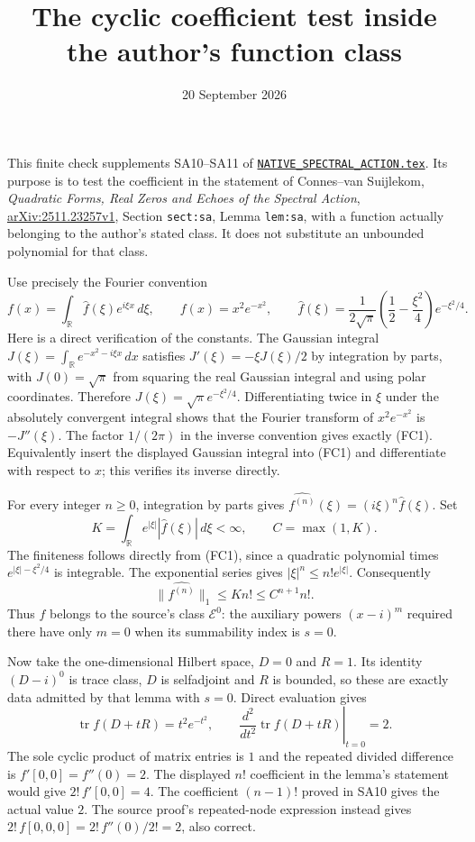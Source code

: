 \documentclass[11pt]{article}
\title{The cyclic coefficient test inside the author's function class}
\author{}\date{20 September 2026}
\begin{document}
\maketitle

This finite check supplements SA10--SA11 of
\href{https://github.com/KokunoYumeto/zeta-function-research-reader/blob/5992ad50c0f2a06921f1fcaded7b4e38097c0739/workbenches/splitzero-tandem/continuations/20260920-original-kernel-mixed-determinants/providers/NATIVE_SPECTRAL_ACTION.tex\#L1}{\texttt{NATIVE\_SPECTRAL\_ACTION.tex}}. Its purpose is to test
the coefficient in the statement of Connes--van Suijlekom,
\emph{Quadratic Forms, Real Zeros and Echoes of the Spectral Action},
\href{https://arxiv.org/abs/2511.23257v1}{arXiv:2511.23257v1},
Section \texttt{sect:sa}, Lemma \texttt{lem:sa}, with a
function actually belonging to the author's stated class.
It does not substitute an unbounded polynomial for that class.

Use precisely the Fourier convention
\[
f(x)=\int_{\mathbb R}\widehat f(\xi)e^{i\xi x}\,d\xi,
\qquad
f(x)=x^2e^{-x^2},\qquad
\widehat f(\xi)=\frac1{2\sqrt\pi}
\left(\frac12-\frac{\xi^2}{4}\right)e^{-\xi^2/4}.
\tag{FC1}
\]
Here is a direct verification of the constants.
The Gaussian integral
$J(\xi)=\int_{\mathbb R}e^{-x^2-i\xi x}\,dx$ satisfies
$J'(\xi)=-\xi J(\xi)/2$ by integration by parts, with
$J(0)=\sqrt\pi$ from squaring the real Gaussian integral
and using polar coordinates. Therefore
$J(\xi)=\sqrt\pi e^{-\xi^2/4}$.
Differentiating twice in $\xi$ under the absolutely
convergent integral shows that the Fourier transform
of $x^2e^{-x^2}$ is $-J''(\xi)$.
The factor $1/(2\pi)$ in the inverse convention gives
exactly (FC1). Equivalently insert the displayed
Gaussian integral into (FC1) and differentiate with
respect to $x$; this verifies its inverse directly.

For every integer $n\geq0$, integration by parts gives
$\widehat{f^{(n)}}(\xi)=(i\xi)^n\widehat f(\xi)$.
Set
\[
K=\int_{\mathbb R}e^{|\xi|}|\widehat f(\xi)|\,d\xi<\infty,
\qquad C=\max(1,K).
\tag{FC2}
\]
The finiteness follows directly from (FC1), since a
quadratic polynomial times $e^{|\xi|-\xi^2/4}$ is
integrable. The exponential series gives
$|\xi|^n\leq n!e^{|\xi|}$. Consequently
\[
\|\widehat{f^{(n)}}\|_1
\leq K n!\leq C^{n+1}n!.
\tag{FC3}
\]
Thus $f$ belongs to the source's class $\mathcal E^0$:
the auxiliary powers $(x-i)^m$ required there have
only $m=0$ when its summability index is $s=0$.

Now take the one-dimensional Hilbert space, $D=0$ and
$R=1$. Its identity $(D-i)^0$ is trace class, $D$ is
selfadjoint and $R$ is bounded, so these are exactly
data admitted by that lemma with $s=0$. Direct evaluation
gives
\[
\operatorname{tr}f(D+tR)=t^2e^{-t^2},\qquad
\left.\frac{d^2}{dt^2}\operatorname{tr}f(D+tR)\right|_{t=0}
=2.
\tag{FC4}
\]
The sole cyclic product of matrix entries is $1$ and
the repeated divided difference is
$f'[0,0]=f''(0)=2$.
The displayed $n!$ coefficient in the lemma's statement
would give $2!\,f'[0,0]=4$. The coefficient
$(n-1)!$ proved in SA10 gives the actual value $2$.
The source proof's repeated-node expression instead
gives $2!\,f[0,0,0]=2!\,f''(0)/2!=2$, also correct.
\end{document}
